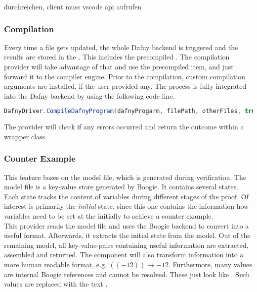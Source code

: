 durchreichen, client muss vscode api aufrufen

\subsubsection{Compilation}
Every time a file gets updated, the whole Dafny backend is triggered and the results are stored in the .
This includes the precompiled .
The compilation provider will take advantage of that and use the precompiled item, and just forward it to the compiler engine.
Prior to the compilation, custom compilation arguments are installed, if the user provided any.
The process is fully integrated into the Dafny backend by using the following code line.\\

\begin{lstlisting}[language=csharp, caption={Calling the Dafny Compiler}, captionpos=b, label={lst:dafnycompiler}]
DafnyDriver.CompileDafnyProgram(dafnyProgarm, filePath, otherFiles, true, textwriter);
\end{lstlisting}

The provider will check if any errors occurred and return the outcome within a wrapper class.

\subsubsection{Counter Example}
This feature bases on the model file, which is generated during verification.
The model file is a key-value store generated by Boogie.
It contains several states.
Each state tracks the content of variables during different stages of the proof.
Of interest is primarily the \textit{initial} state, since this one contains the information how variables need to be set at the initially to achieve a counter example.\\

This provider reads the model file and uses the Boogie backend to convert into a useful format.
Afterwards, it extracts the initial state from the model.
Out of the remaining model, all key-value-pairs containing useful information are extracted, assembled and returned.
The component will also transform information into a more human readable format, e.g. $((- 12)) \rightarrow -12$.
Furthermore, many values are internal Boogie references and cannot be resolved.
These just look like .
Such values are replaced with the text .\\

